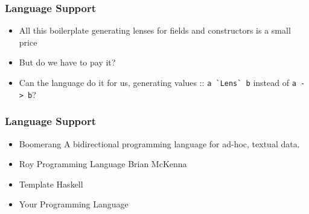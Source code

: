 \begin{frame}
\frametitle{Language Support}

\begin{itemize}
\item All this boilerplate generating lenses for fields and constructors is a small price
\item But do we have to pay it?
\item Can the language do it for us, generating values :: \lstinline$a `Lens` b$ instead of \lstinline$a -> b$?
\end{itemize}

\end{frame}

\begin{frame}
\frametitle{Language Support}

\begin{itemize}
\item Boomerang \textemdash A bidirectional programming language for ad-hoc, textual data. 
\item Roy Programming Language \textemdash Brian McKenna
\item Template Haskell
\item Your Programming Language
\end{itemize}

\end{frame}

